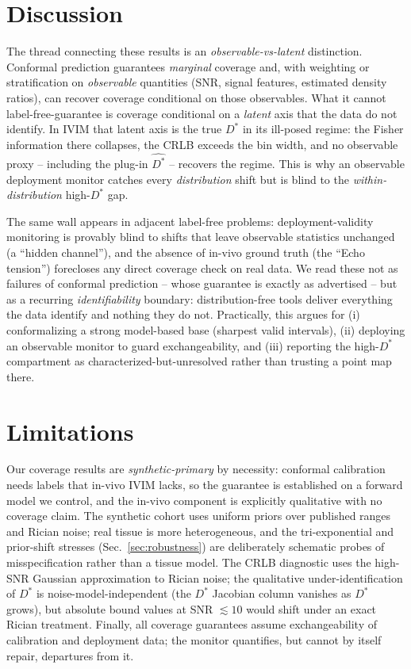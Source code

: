 \documentclass[11pt]{article}
\newcommand{\Dstar}{D^{*}}
\begin{document}
\section{Discussion}
The thread connecting these results is an \emph{observable-vs-latent} distinction.
Conformal prediction guarantees \emph{marginal} coverage and, with weighting or
stratification on \emph{observable} quantities (SNR, signal features, estimated
density ratios), can recover coverage conditional on those observables. What it
cannot label-free-guarantee is coverage conditional on a \emph{latent} axis that
the data do not identify. In IVIM that latent axis is the true $\Dstar$ in its
ill-posed regime: the Fisher information there collapses, the CRLB exceeds the bin
width, and no observable proxy -- including the plug-in $\hat{\Dstar}$ -- recovers
the regime. This is why an observable deployment monitor catches every
\emph{distribution} shift but is blind to the \emph{within-distribution} high-$\Dstar$
gap.

The same wall appears in adjacent label-free problems: deployment-validity
monitoring is provably blind to shifts that leave observable statistics unchanged
(a ``hidden channel''), and the absence of in-vivo ground truth (the ``Echo
tension'') forecloses any direct coverage check on real data. We read these not as
failures of conformal prediction -- whose guarantee is exactly as advertised -- but
as a recurring \emph{identifiability} boundary: distribution-free tools deliver
everything the data identify and nothing they do not. Practically, this argues for
(i) conformalizing a strong model-based base (sharpest valid intervals), (ii)
deploying an observable monitor to guard exchangeability, and (iii) reporting the
high-$\Dstar$ compartment as characterized-but-unresolved rather than trusting a
point map there.

\section{Limitations}
Our coverage results are \emph{synthetic-primary} by necessity: conformal
calibration needs labels that in-vivo IVIM lacks, so the guarantee is established
on a forward model we control, and the in-vivo component is explicitly qualitative
with no coverage claim. The synthetic cohort uses uniform priors over published
ranges and Rician noise; real tissue is more heterogeneous, and the
tri-exponential and prior-shift stresses (Sec.~\ref{sec:robustness}) are
deliberately schematic probes of misspecification rather than a tissue model. The
CRLB diagnostic uses the high-SNR Gaussian approximation to Rician noise; the
qualitative under-identification of $\Dstar$ is noise-model-independent (the
$\Dstar$ Jacobian column vanishes as $\Dstar$ grows), but absolute bound values at
SNR $\lesssim10$ would shift under an exact Rician treatment. Finally, all coverage
guarantees assume exchangeability of calibration and deployment data; the monitor
quantifies, but cannot by itself repair, departures from it.
\end{document}
